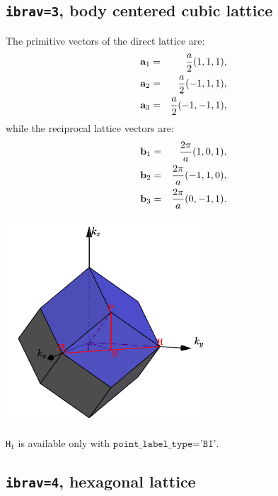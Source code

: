 \documentclass[12pt,a4paper]{article}
\begin{document}
\subsection{\texttt{ibrav=3}, body centered cubic lattice}

The primitive vectors of the direct lattice are:
\begin{eqnarray}
{\bf a}_1 &=&{a \over 2} (1, 1, 1), \nonumber \\
{\bf a}_2 &=&{a \over 2} (-1, 1, 1), \nonumber \\
{\bf a}_3 &=&{a \over 2} (-1, -1, 1), \nonumber
\nonumber
\end{eqnarray}
while the reciprocal lattice vectors are:
\begin{eqnarray}
{\bf b}_1 &=&{2\pi \over a} (1, 0, 1), \nonumber \\
{\bf b}_2 &=&{2\pi \over a} (-1, 1, 0), \nonumber \\
{\bf b}_3 &=&{2\pi \over a} (0, -1, 1). \nonumber
\nonumber
\end{eqnarray}
\begin{center}
\includegraphics[width=7.5cm,angle=0]{images/bcc_bi.png}
\end{center}
\texttt{H$_1$} is available only with $\texttt{point\_label\_type='BI'}$.

\subsection{\texttt{ibrav=4}, hexagonal lattice}
\end{document}
